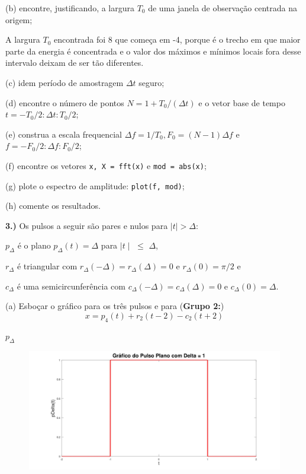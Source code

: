\documentclass[10pt]{article}
\begin{document}
(b) encontre, justificando, a largura $T_0$ de uma janela de observação centrada na origem;

\vspace{\baselineskip}

A largura $T_0$ encontrada foi 8 que começa em -4, porque é o trecho em que maior parte da energia é concentrada e o valor dos máximos e mínimos locais fora desse intervalo deixam de ser tão diferentes.

\vspace{\baselineskip}

(c) idem período de amostragem $\Delta t$ seguro;

(d) encontre o número de pontos $N = 1 + T_0 / (\Delta t)$ e o vetor base de tempo $t = -T_0 / 2 : \Delta t : T_0 / 2$;

(e) construa a escala frequencial $\Delta f = 1 / T_0, F_0 = (N - 1)\Delta f$ e $f = -F_0 / 2 : \Delta f : F_0 / 2$;

(f) encontre os vetores \texttt{x, X = fft(x)} e \texttt{mod = abs(x)};

(g) plote o espectro de amplitude: \texttt{plot(f, mod)};

(h) comente os resultados.


\vspace{\baselineskip}


\textbf{3.)} Os pulsos a seguir são pares e nulos para $\mid t \mid > \Delta$:

$p_{\Delta}$ é o plano $p_{\Delta}(t) = \Delta$ para $\mid t \mid\,\,\leq\,\, \Delta$,

$r_{\Delta}$ é triangular com $r_{\Delta}(-\Delta) = r_{\Delta}(\Delta) = 0$ e $r_{\Delta}(0) = \pi / 2$ e

$c_{\Delta}$ é uma semicircunferência com $c_{\Delta}(-\Delta) = c_{\Delta}(\Delta) = 0$ e $c_{\Delta}(0) = \Delta$.

(a) Esboçar o gráfico para os três pulsos e para (\textbf{Grupo 2:})
\[x = p_4(t) + r_2(t - 2) - c_2(t + 2)\]

$p_{\Delta}$

\begin{figure}[h]
    \includegraphics[scale=0.15]{questao3a1}
    \centering
\end{figure}
\end{document}
